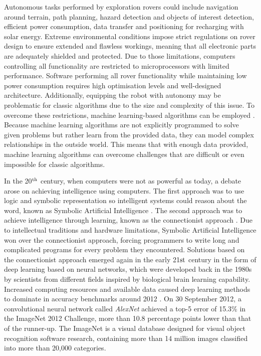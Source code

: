 \documentclass[a4paper,twoside,12pt]{book}
\begin{document}
Autonomous tasks performed by exploration rovers could include navigation around terrain, path planning, hazard detection and objects of interest detection, efficient power consumption, data transfer and positioning for recharging with solar energy. Extreme environmental conditions impose strict regulations on rover design to ensure extended and flawless workings, meaning that all electronic parts are adequately shielded and protected. Due to those limitations, computers controlling all functionality are restricted to microprocessors with limited performance. Software performing all rover functionality while maintaining low power consumption requires high optimisation levels and well-designed architecture. Additionally, equipping the robot with autonomy may be problematic for classic algorithms due to the size and complexity of this issue. To overcome these restrictions, machine learning-based algorithms can be employed \cite{bajracharya2008autonomy}. Because machine learning algorithms are not explicitly programmed to solve given problems but rather learn from the provided data, they can model complex relationships in the outside world. This means that with enough data provided, machine learning algorithms can overcome challenges that are difficult or even impossible for classic algorithms.

In the 20$^{\rm th}$ century, when computers were not as powerful as today, a debate arose on achieving intelligence using computers. The first approach was to use logic and symbolic representation so intelligent systems could reason about the word, known as Symbolic Artificial Intelligence \cite{kolata1982can}. The second approach was to achieve intelligence through learning, known as the connectionist approach \cite{smolensky1999grammar}. Due to intellectual traditions and hardware limitations, Symbolic Artificial Intelligence won over the connectionist approach, forcing programmers to write long and complicated programs for every problem they encountered. Solutions based on the connectionist approach emerged again in the early 21${\rm st}$ century in the form of deep learning based on neural networks, which were developed back in the 1980s by scientists from different fields inspired by biological brain learning capability. Increased computing resources and available data caused deep learning methods to dominate in accuracy benchmarks around 2012 \cite{krizhevsky2017imagenet}. On 30 September 2012, a convolutional neural network called \emph{AlexNet} achieved a top-5 error of 15.3\% in the ImageNet 2012 Challenge, more than 10.8 percentage points lower than that of the runner-up. The ImageNet \cite{russakovsky2015imagenet} is a visual database designed for visual object recognition software research, containing more than 14 million images classified into more than 20,000 categories.
\end{document}
